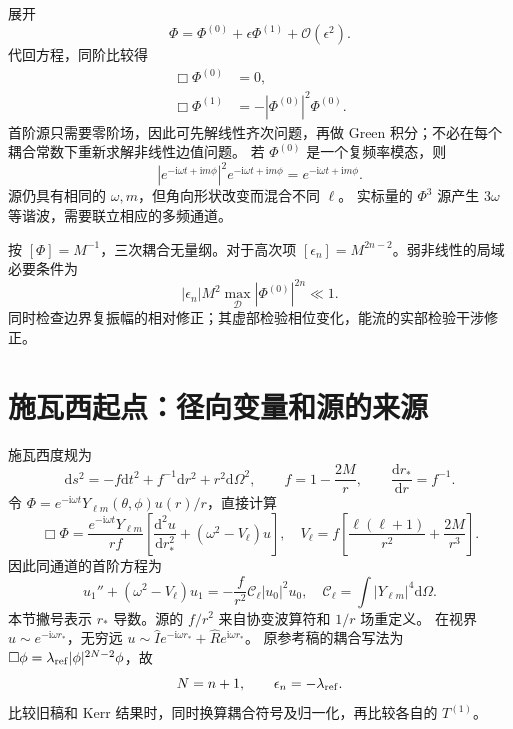 \documentclass[UTF8,fontset=fandol,11pt,a4paper]{ctexart}
\newcommand{\ii}{\mathrm{i}}
\newcommand{\dd}{\mathrm{d}}
\newcommand{\calO}{\mathcal O}
\numberwithin{equation}{section}
\begin{document}
展开
\begin{equation}
\Phi=\Phi^{(0)}+\epsilon\Phi^{(1)}+\calO(\epsilon^2).
\end{equation}
代回方程，同阶比较得
\begin{align}
\Box\Phi^{(0)}&=0,\\
\Box\Phi^{(1)}&=-|\Phi^{(0)}|^2\Phi^{(0)}.
\end{align}
首阶源只需要零阶场，因此可先解线性齐次问题，再做 Green 积分；不必在每个耦合常数下重新求解非线性边值问题。
若 $\Phi^{(0)}$ 是一个复频率模态，则
\begin{equation}
|e^{-\ii\omega t+\ii m\phi}|^2 e^{-\ii\omega t+\ii m\phi}
=e^{-\ii\omega t+\ii m\phi}.
\end{equation}
源仍具有相同的 $\omega,m$，但角向形状改变而混合不同 $\ell$。
实标量的 $\Phi^3$ 源产生 $3\omega$ 等谐波，需要联立相应的多频通道。

按 $[\Phi]=M^{-1}$，三次耦合无量纲。对于高次项
$[\epsilon_n]=M^{2n-2}$。弱非线性的局域必要条件为
\begin{equation}
|\epsilon_n|M^2\max_{\mathcal D}|\Phi^{(0)}|^{2n}\ll1.
\end{equation}
同时检查边界复振幅的相对修正；其虚部检验相位变化，能流的实部检验干涉修正。

\section{施瓦西起点：径向变量和源的来源}
施瓦西度规为
\begin{equation}
\dd s^2=-f\dd t^2+f^{-1}\dd r^2+r^2\dd\Omega^2,\qquad f=1-\frac{2M}{r},
\qquad\frac{\dd r_*}{\dd r}=f^{-1}.
\end{equation}
令 $\Phi=e^{-\ii\omega t}Y_{\ell m}(\theta,\phi)u(r)/r$，直接计算
\begin{equation}
\Box\Phi=\frac{e^{-\ii\omega t}Y_{\ell m}}{rf}
\left[\frac{\dd^2u}{\dd r_*^2}+
\left(\omega^2-V_\ell\right)u\right],
\quad V_\ell=f\left[\frac{\ell(\ell+1)}{r^2}+\frac{2M}{r^3}\right].
\end{equation}
因此同通道的首阶方程为
\begin{equation}
u_1''+(\omega^2-V_\ell)u_1
=-\frac{f}{r^2}\mathcal C_\ell |u_0|^2u_0,
\quad \mathcal C_\ell=\int |Y_{\ell m}|^4\dd\Omega.
\end{equation}
本节撇号表示 $r_*$ 导数。源的 $f/r^2$ 来自协变波算符和 $1/r$ 场重定义。
在视界 $u\sim e^{-\ii\omega r_*}$，无穷远
$u\sim\widehat I e^{-\ii\omega r_*}+\widehat R e^{\ii\omega r_*}$。
原参考稿的耦合写法为 $\Box\phi=\lambda_{\rm ref}|\phi|^{2N-2}\phi$，故
\begin{equation}N=n+1,\qquad \epsilon_n=-\lambda_{\rm ref}.\end{equation}
比较旧稿和 Kerr 结果时，同时换算耦合符号及归一化，再比较各自的 $T^{(1)}$。
\end{document}
